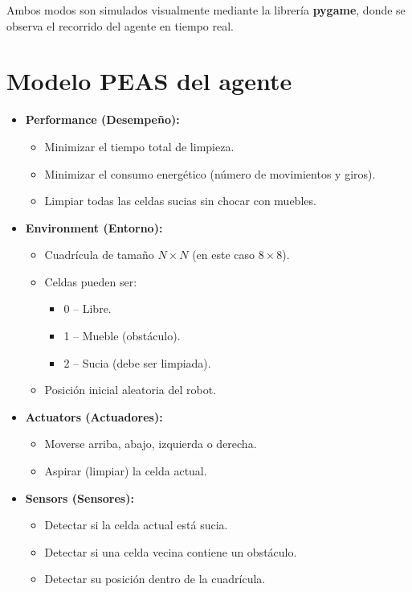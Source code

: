 \documentclass[12pt,a4paper]{article}
\begin{document}
Ambos modos son simulados visualmente mediante la librería \textbf{pygame}, donde se observa el recorrido del agente en tiempo real.

\section{Modelo PEAS del agente}

\begin{itemize}
    \item \textbf{Performance (Desempeño):}
    \begin{itemize}
        \item Minimizar el tiempo total de limpieza.
        \item Minimizar el consumo energético (número de movimientos y giros).
        \item Limpiar todas las celdas sucias sin chocar con muebles.
    \end{itemize}

    \item \textbf{Environment (Entorno):}
    \begin{itemize}
        \item Cuadrícula de tamaño $N \times N$ (en este caso $8\times8$).
        \item Celdas pueden ser:
        \begin{itemize}
            \item 0 – Libre.
            \item 1 – Mueble (obstáculo).
            \item 2 – Sucia (debe ser limpiada).
        \end{itemize}
        \item Posición inicial aleatoria del robot.
    \end{itemize}

    \item \textbf{Actuators (Actuadores):}
    \begin{itemize}
        \item Moverse arriba, abajo, izquierda o derecha.
        \item Aspirar (limpiar) la celda actual.
    \end{itemize}

    \item \textbf{Sensors (Sensores):}
    \begin{itemize}
        \item Detectar si la celda actual está sucia.
        \item Detectar si una celda vecina contiene un obstáculo.
        \item Detectar su posición dentro de la cuadrícula.
    \end{itemize}
\end{itemize}
\end{document}
